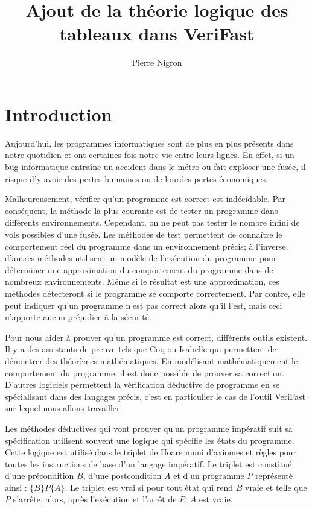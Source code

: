\documentclass[11pt,openany]{article}
\title{Ajout de la th\'eorie logique des tableaux dans VeriFast}
\author{Pierre Nigron}
\newcommand{\verifast}{VeriFast}
\begin{document}
\maketitle
\sloppy

\tableofcontents

\section*{Introduction}
		Aujourd'hui, les programmes informatiques sont de plus en plus pr\'esents dans notre quotidien et ont certaines fois notre vie entre leurs lignes. En effet, si un bug informatique entra\^ine un accident dans le m\'etro ou fait exploser une fus\'ee, il risque d'y avoir des pertes humaines ou de lourdes pertes \'economiques.
		
		Malheureusement, v\'erifier qu'un programme est correct est ind\'ecidable. Par cons\'equent, la m\'ethode la plus courante est de tester un programme dans diff\'erents environnements. Cependant, on ne peut pas tester le nombre infini de vols possibles d'une fus\'ee. Les m\'ethodes de test permettent de conna\^itre le comportement r\'eel du programme dans un environnement pr\'ecis; \`a l'inverse, d'autres m\'ethodes utilisent un mod\`ele de l'ex\'ecution du programme pour d\'eterminer une approximation du comportement du programme dans de nombreux environnements. M\^eme si le r\'esultat est une approximation, ces m\'ethodes d\'etecteront si le programme se comporte correctement. Par contre, elle peut indiquer qu'un programme n'est pas correct alors qu'il l'est, mais ceci n'apporte aucun pr\'ejudice \`a la s\'ecurit\'e.

		Pour nous aider \`a prouver qu'un programme est correct, diff\'erents outils existent. Il y a des assistants de preuve tels que Coq ou Isabelle qui permettent de d\'emontrer des th\'eor\`emes math\'ematiques. En mod\'elisant math\'ematiquement le comportement du programme, il est donc possible de prouver sa correction. D'autres logiciels permettent la v\'erification d\'eductive de programme en se sp\'ecialisant dans des langages pr\'ecis, c'est en particulier le cas de l'outil \verifast{} sur lequel nous allons travailler. 
	
	Les m\'ethodes d\'eductives qui vont prouver qu'un programme imp\'eratif suit sa sp\'ecification utilisent souvent une logique qui sp\'ecifie les \'etats du programme. Cette logique est utilis\'e dans le triplet de Hoare muni d'axiomes et r\`egles pour toutes les instructions de base d'un langage imp\'eratif. Le triplet est constitu\'e d'une pr\'econdition $B$, d'une postcondition $A$ et d'un programme $P$ repr\'esent\'e ainsi : $\{B\}P\{A\}$. Le triplet est vrai si pour tout \'etat qui rend $B$ vraie et telle que $P$ s'arr\^ete, alors, apr\`es l'ex\'ecution et l'arr\^et de $P$, $A$ est vraie.
	
\end{document}
